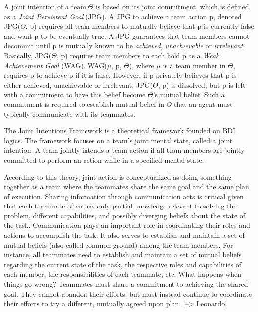 \documentclass[11pt]{article}
\begin{document}
A joint intention of a team $\Theta$ is based on its joint commitment, which is
defined as a \textit{Joint Persistent Goal} (JPG). A JPG to achieve a team
action p, denoted JPG($\Theta$, p) requires all team members to mutually believe
that p is currently false and want p to be eventually true. A JPG guarantees
that team members cannot decommit until p is mutually known to be
\textit{achieved, unachievable} or \textit{irrelevant}. Basically, JPG($\Theta$,
p) requires team members to each hold p as a \textit{Weak Achievement Goal}
(WAG). WAG($\mu$, p, $\Theta$), where $\mu$ is a team member in $\Theta$,
requires p to achieve p if it is false. However, if p privately believes that p
is either achieved, unachievable or irrelevant, JPG($\Theta$, p) is dissolved,
but p is left with a commitment to have this belief become $\Theta$'s mutual
belief. Such a commitment is required to establish mutual belief in $\Theta$
that an agent must typically communicate with its teammates.

The Joint Intentions Framework \cite{levesque:acting-together}
\cite{cohen:intention-commitment} \cite{cohen:persistence-intention-commitment}
is a theoretical framework founded on BDI logics. The framework focuses on a
team's joint mental state, called a joint intention. A team jointly intends a
team action if all team members are jointly committed to perform an action while
in a specified mental state.

According to this theory, joint action is conceptualized as doing something
together as a team where the teammates share the same goal and the same plan of
execution. Sharing information through communication acts is critical given that
each teammate often has only partial knowledge relevant to solving the problem,
different capabilities, and possibly diverging beliefs about the state of the
task. Communication plays an important role in coordinating their roles and
actions to accomplish the task. It also serves to establish and maintain a set
of mutual beliefs (also called common ground) among the team members. For
instance, all teammates need to establish and maintain a set of mutual beliefs
regarding the current state of the task, the respective roles and capabilities
of each member, the responsibilities of each teammate, etc. What happens when
things go wrong? Teammates must share a commitment to achieving the shared goal.
They cannot abandon their efforts, but must instead continue to coordinate their
efforts to try a different, mutually agreed upon plan. [--> Leonardo]
\end{document}

